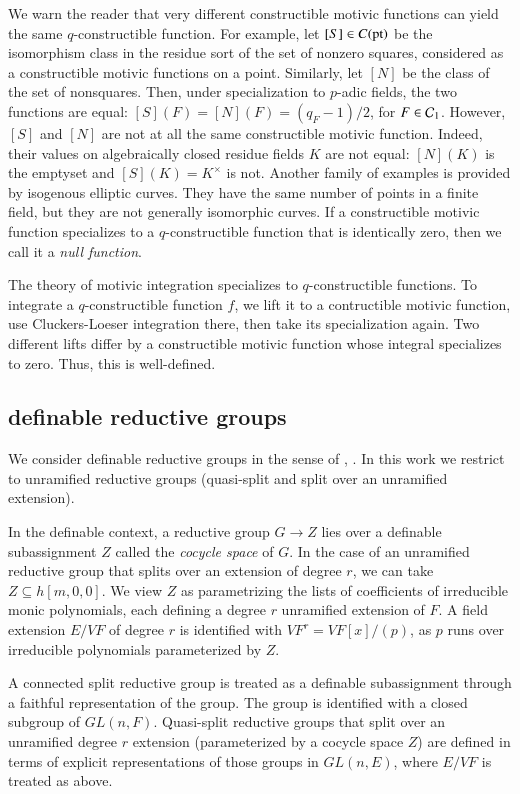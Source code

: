 We warn the reader that
very different constructible motivic functions can yield the same $q$-constructible function.  For example,
let $[S]\in C({\operatorname{pt}})$ be the isomorphism class in the residue sort of the set of nonzero squares, considered as a 
constructible motivic functions on a point.  Similarly, let $[N]$ be the class of the set of nonsquares.  Then, under specialization
to $p$-adic fields, the
two functions are equal:
$[S](F) = [N](F) = (q_F-1)/2$, for $F\in\mathcal C_1$. However, $[S]$ and $[N]$ are not at all the same constructible motivic function. Indeed,  their values on 
algebraically closed residue fields $K$ are not equal: $[N](K)$ is the emptyset and $[S](K) = K^\times$ is not.
Another family of examples is provided by isogenous elliptic curves.  They have the same number of points in a finite field, but
they are not generally isomorphic curves.
If a constructible motivic function specializes to a $q$-constructible function that is identically zero, then we call
it a {\it null function}.

The theory of motivic integration specializes to $q$-constructible functions. To integrate a $q$-constructible function $f$, we lift it to 
a contructible motivic function, use Cluckers-Loeser integration there, then take its specialization again.
Two different lifts differ by a constructible motivic function whose integral specializes to zero. Thus, this
is well-defined.

\subsection{definable reductive groups}

We consider definable reductive groups in the sense of \cite{cluckers2011transfer}, \cite{gordon}.
In this work we restrict to unramified reductive groups (quasi-split and split over an unramified extension).

In the definable context, a reductive group $G\to Z$ lies over a definable subassignment
$Z$ called the {\it cocycle space} of $G$.  In the case of an unramified reductive group that splits over an extension of degree $r$, 
we can take $Z\subseteq h[m,0,0]$.  
We view $Z$ as parametrizing the lists of coefficients of irreducible monic 
polynomials, each  defining a degree $r$ unramified extension of $F$.  A field extension $E/VF$ of degree $r$ is identified
with $VF^r = VF[x]/(p)$, as $p$ runs over irreducible polynomials parameterized by $Z$.

A connected split reductive group is treated as a definable subassignment through a faithful representation of the group.
The group is identified with a closed subgroup of $GL(n,F)$.  Quasi-split reductive groups that split over an unramified degree $r$
extension (parameterized by a cocycle space $Z$) are defined in terms of explicit representations of those groups
in $GL(n,E)$, where $E/VF$ is treated as above.

